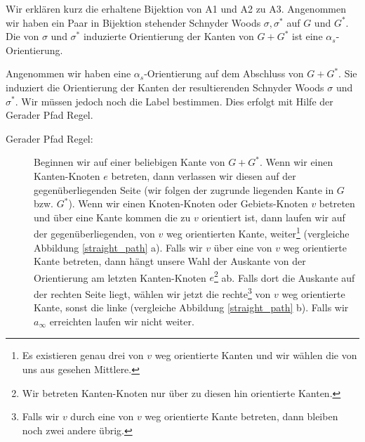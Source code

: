 Wir erklären kurz die erhaltene Bijektion von A1 und A2 zu A3. Angenommen wir haben ein Paar in Bijektion stehender Schnyder Woods $\sigma,\sigma^*$ auf $G$ und $G^*$. Die von $\sigma$ und $\sigma^*$ induzierte Orientierung der Kanten von $G+G^*$ ist eine $\alpha_s$-Orientierung. 

Angenommen wir haben eine $\alpha_s$-Orientierung auf dem Abschluss von $G+G^*$. Sie induziert die Orientierung der Kanten der resultierenden Schnyder Woods $\sigma$ und $\sigma^*$. Wir müssen jedoch noch die Label bestimmen. Dies erfolgt mit Hilfe der Gerader Pfad Regel. 

\begin{description}
\item[Gerader Pfad Regel:] Beginnen wir auf einer beliebigen Kante von $G+G^*$. Wenn wir einen Kanten-Knoten $e$ betreten, dann verlassen wir diesen auf der gegenüberliegenden Seite (wir folgen der zugrunde liegenden Kante in $G$ bzw. $G^*$). Wenn wir einen Knoten-Knoten oder Gebiets-Knoten $v$ betreten und über eine Kante kommen die zu $v$ orientiert ist, dann laufen wir auf der gegenüberliegenden, von $v$ weg orientierten Kante, weiter\footnote{Es existieren genau drei von $v$ weg orientierte Kanten und wir wählen die von uns aus gesehen Mittlere.} (vergleiche Abbildung \ref{straight_path} a). Falls wir $v$ über eine von $v$ weg orientierte Kante betreten, dann hängt unsere Wahl der Auskante von der Orientierung am letzten Kanten-Knoten $e$\footnote{Wir betreten Kanten-Knoten nur über zu diesen hin orientierte Kanten.} ab. Falls dort die Auskante auf der rechten Seite liegt, wählen wir jetzt die rechte\footnote{Falls wir $v$ durch eine von $v$ weg orientierte Kante betreten, dann bleiben noch zwei andere übrig.} von $v$ weg orientierte Kante, sonst die linke (vergleiche Abbildung \ref{straight_path} b). Falls wir $a_\infty$ erreichten laufen wir nicht weiter. 
\end{description}

